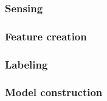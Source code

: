 \subsubsection{Sensing}
\label{sec:sensing}


\subsubsection{Feature creation}
\label{sec:feature-creation}


\subsubsection{Labeling}
\label{sec:labeling}


\subsubsection{Model construction}
\label{sec:model-creation}

